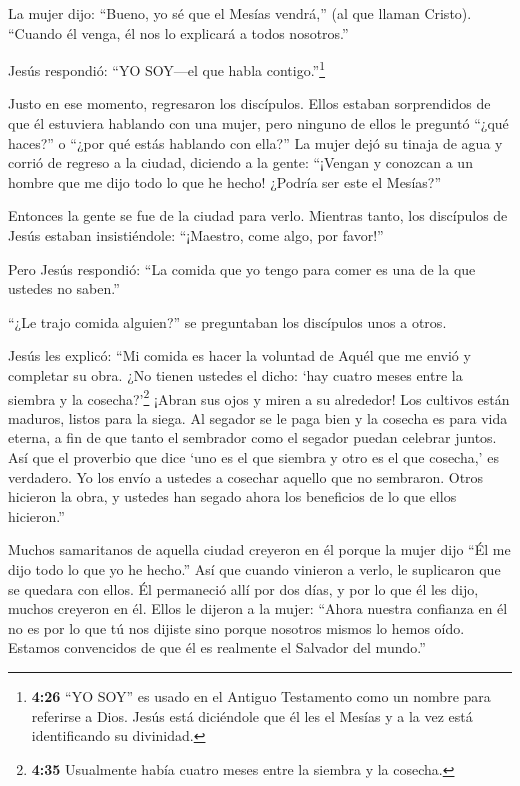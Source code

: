  La mujer dijo: ``Bueno, yo sé que el Mesías vendrá,'' (al
que llaman Cristo). ``Cuando él venga, él nos lo explicará a todos
nosotros.''

 Jesús respondió: ``YO SOY---el que habla
contigo.''\footnote{\textbf{4:26} ``YO SOY'' es usado en el Antiguo
  Testamento como un nombre para referirse a Dios. Jesús está diciéndole
  que él les el Mesías y a la vez está identificando su divinidad.}

 Justo en ese momento, regresaron los discípulos. Ellos
estaban sorprendidos de que él estuviera hablando con una mujer, pero
ninguno de ellos le preguntó ``¿qué haces?'' o ``¿por qué estás hablando
con ella?''  La mujer dejó su tinaja de agua y corrió de
regreso a la ciudad, diciendo a la gente:  ``¡Vengan y
conozcan a un hombre que me dijo todo lo que he hecho! ¿Podría ser este
el Mesías?''

 Entonces la gente se fue de la ciudad para verlo.
 Mientras tanto, los discípulos de Jesús estaban
insistiéndole: ``¡Maestro, come algo, por favor!''

 Pero Jesús respondió: ``La comida que yo tengo para comer
es una de la que ustedes no saben.''

 ``¿Le trajo comida alguien?'' se preguntaban los
discípulos unos a otros.

 Jesús les explicó: ``Mi comida es hacer la voluntad de
Aquél que me envió y completar su obra.  ¿No tienen ustedes
el dicho: `hay cuatro meses entre la siembra y la cosecha?'\footnote{\textbf{4:35}
  Usualmente había cuatro meses entre la siembra y la cosecha.} ¡Abran
sus ojos y miren a su alrededor! Los cultivos están maduros, listos para
la siega.  Al segador se le paga bien y la cosecha es para
vida eterna, a fin de que tanto el sembrador como el segador puedan
celebrar juntos.  Así que el proverbio que dice `uno es el
que siembra y otro es el que cosecha,' es verdadero.  Yo
los envío a ustedes a cosechar aquello que no sembraron. Otros hicieron
la obra, y ustedes han segado ahora los beneficios de lo que ellos
hicieron.''

 Muchos samaritanos de aquella ciudad creyeron en él porque
la mujer dijo ``Él me dijo todo lo que yo he hecho.''  Así
que cuando vinieron a verlo, le suplicaron que se quedara con ellos. Él
permaneció allí por dos días,  y por lo que él les dijo,
muchos creyeron en él.  Ellos le dijeron a la mujer:
``Ahora nuestra confianza en él no es por lo que tú nos dijiste sino
porque nosotros mismos lo hemos oído. Estamos convencidos de que él es
realmente el Salvador del mundo.''

